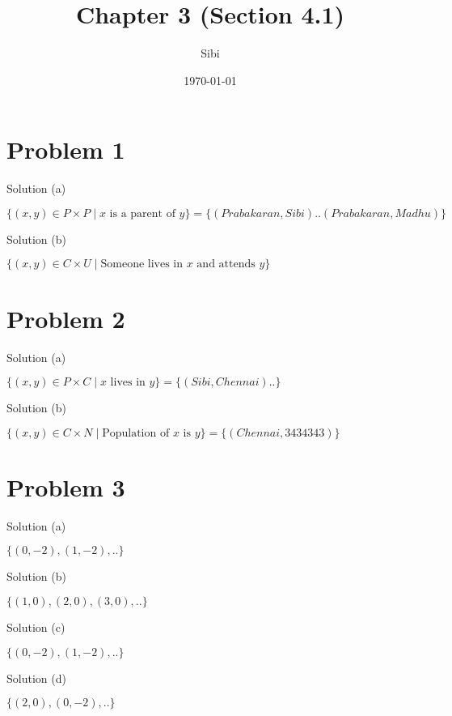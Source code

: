 \documentclass{article}
\begin{document}
\title{Chapter 3 (Section 4.1)}
\author{Sibi}
\date{\today}
\maketitle
\newpage

\section{Problem 1}

Solution (a)

$\{(x,y) \in P \times P \mid x \text{ is a parent of } y \} = \{(Prabakaran, Sibi) ..
(Prabakaran, Madhu)\}$ 

Solution (b)

$\{(x,y) \in C \times U \mid \text{Someone lives in } x \text{ and
    attends } y \}$

\section{Problem 2}

Solution (a)

$\{(x,y) \in P \times C \mid x \text{ lives in } y \} = \{(Sibi, Chennai) .. \}$

Solution (b)

$\{(x,y) \in C \times N \mid \text{Population of } x \text{ is } y \} = \{(Chennai, 3434343)\}$

\section{Problem 3}

Solution (a)

$\{(0,-2), (1,-2), ..\}$

Solution (b)

$\{(1,0), (2,0), (3,0), ..\}$

Solution (c)

$\{(0,-2), (1,-2), ..\}$

Solution (d)

$\{(2,0), (0, -2), ..\}$
\end{document}
